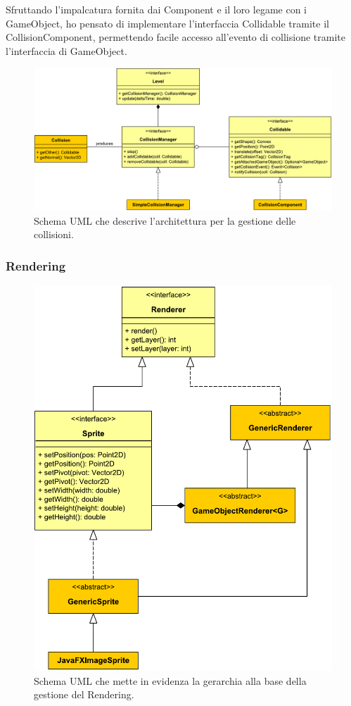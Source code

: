 \documentclass[a4paper,12pt]{report}
\begin{document}
Sfruttando l'impalcatura fornita dai Component e il loro legame con i GameObject, ho pensato di implementare l'interfaccia Collidable tramite il CollisionComponent, permettendo facile accesso all'evento di collisione tramite l'interfaccia di GameObject.

\begin{figure}[H]
\includegraphics[width=\linewidth]{img/collisions}
\caption{Schema UML che descrive l'architettura per la gestione delle collisioni.}
\label{img:collisions}
\end{figure}

\subsubsection*{Rendering}

\begin{figure}[H]
\includegraphics[width=\linewidth]{img/renderers}
\caption{Schema UML che mette in evidenza la gerarchia alla base della gestione del Rendering.}
\label{img:renderers}
\end{figure}
\end{document}
